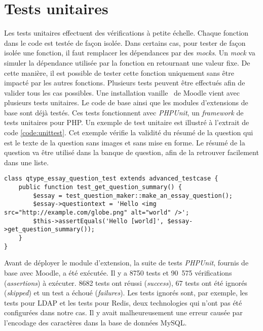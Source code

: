 \section{Tests unitaires}
Les tests unitaires effectuent des v\'erifications \`a petite \'echelle.
Chaque fonction dans le code est test\'ee de fa\c{c}on isol\'ee.
Dans certains cas, pour tester de fa\c{c}on isol\'ee une fonction, il faut remplacer les d\'ependances par des \textit{mocks}.
Un \textit{mock} va simuler la d\'ependance utilis\'ee par la fonction en retournant une valeur fixe.
De cette mani\`ere, il est possible de tester cette fonction uniquement sans \^etre impact\'e par les autres fonctions.
Plusieurs tests peuvent \^etre effectu\'es afin de valider tous les cas possibles. \cite{tremblay16}
Une installation \og vanille \fg\ de Moodle vient avec plusieurs tests unitaires.
Le code de base ainsi que les modules d'extensions de base sont d\'ej\`a test\'es.
Ces tests fonctionnent avec \textit{PHPUnit}, un \textit{framework} de tests unitaires pour PHP.
Un exemple de test unitaire est illustr\'e \`a l'extrait de code \ref{code:unittest}.
Cet exemple v\'erifie la validit\'e du r\'esum\'e de la question qui est le texte de la question sans images et sans mise en forme.
Le r\'esum\'e de la question va \^etre utilis\'e dans la banque de question, afin de la retrouver facilement dans une liste.
\begin{lstfloat}
\begin{lstlisting}[frame=l]
class qtype_essay_question_test extends advanced_testcase {
    public function test_get_question_summary() {
        $essay = test_question_maker::make_an_essay_question();
        $essay->questiontext = 'Hello <img src="http://example.com/globe.png" alt="world" />';
        $this->assertEquals('Hello [world]', $essay->get_question_summary());
    }
}
\end{lstlisting}
\caption{Exemple de test unitaire du module d'extension \textit{qtype\_essay}.}
\label{code:unittest}
\end{lstfloat}
Avant de d\'eployer le module d'extension, la suite de tests \textit{PHPUnit}, fournis de base avec Moodle, a \'et\'e ex\'ecut\'ee.
Il y a 8750 tests et 90~575 v\'erifications (\textit{assertions}) \`a ex\'ecuter.
8682 tests ont r\'eussi (\textit{success}), 67 tests ont \'et\'e ignor\'es (\textit{skipped}) et un test a \'echou\'e (\textit{failures}).
Les tests ignor\'es sont, par exemple, les tests pour LDAP et les tests pour Redis, deux technologies qui n'ont pas \'et\'e configur\'ees dans notre cas.
Il y avait malheureusement une erreur caus\'ee par l'encodage des caract\`eres dans la base de donn\'ees MySQL.
